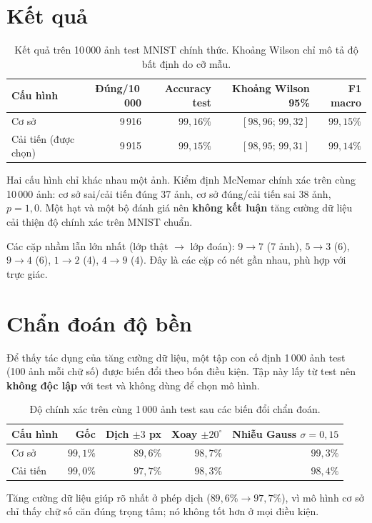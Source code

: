 \section{Kết quả}
\begin{table}[H]\centering
\begin{tabular}{lrrrr}
\toprule
Cấu hình & Đúng/10\,000 & Accuracy test & Khoảng Wilson 95\% & F1 macro \\
\midrule
Cơ sở & 9\,916 & $99{,}16\%$ & $[98{,}96;\,99{,}32]$ & $99{,}15\%$ \\
Cải tiến (được chọn) & 9\,915 & $99{,}15\%$ & $[98{,}95;\,99{,}31]$ & $99{,}14\%$ \\
\bottomrule
\end{tabular}
\caption{Kết quả trên 10\,000 ảnh test MNIST chính thức. Khoảng Wilson \cite{wilson1927} chỉ mô tả độ bất định do cỡ mẫu.}
\end{table}

Hai cấu hình chỉ khác nhau một ảnh. Kiểm định McNemar chính xác \cite{mcnemar1947} trên cùng 10\,000 ảnh: cơ sở sai/cải tiến đúng 37 ảnh, cơ sở đúng/cải tiến sai 38 ảnh, $p=1{,}0$.
Một hạt và một bộ đánh giá nên \textbf{không kết luận} tăng cường dữ liệu cải thiện độ chính xác trên MNIST chuẩn.


Các cặp nhầm lẫn lớn nhất (lớp thật $\to$ lớp đoán): $9\to7$ (7 ảnh), $5\to3$ (6), $9\to4$ (6), $1\to2$ (4), $4\to9$ (4). Đây là các cặp có nét gần nhau, phù hợp với trực giác.


\section{Chẩn đoán độ bền}
Để thấy tác dụng của tăng cường dữ liệu, một tập con cố định 1\,000 ảnh test (100 ảnh mỗi chữ số) được biến đổi theo bốn điều kiện. Tập này lấy từ test nên
\textbf{không độc lập} với test và không dùng để chọn mô hình.
\begin{table}[H]\centering
\begin{tabular}{lrrrr}
\toprule
Cấu hình & Gốc & Dịch $\pm3$ px & Xoay $\pm20^{\circ}$ & Nhiễu Gauss $\sigma=0{,}15$ \\
\midrule
Cơ sở & $99{,}1\%$ & $89{,}6\%$ & $98{,}7\%$ & $99{,}3\%$ \\
Cải tiến & $99{,}0\%$ & $97{,}7\%$ & $98{,}3\%$ & $98{,}4\%$ \\
\bottomrule
\end{tabular}
\caption{Độ chính xác trên cùng 1\,000 ảnh test sau các biến đổi chẩn đoán.}
\end{table}
Tăng cường dữ liệu giúp rõ nhất ở phép dịch ($89{,}6\%\to97{,}7\%$), vì mô hình cơ sở chỉ thấy chữ số căn đúng trọng tâm; nó không tốt hơn ở mọi điều kiện.

